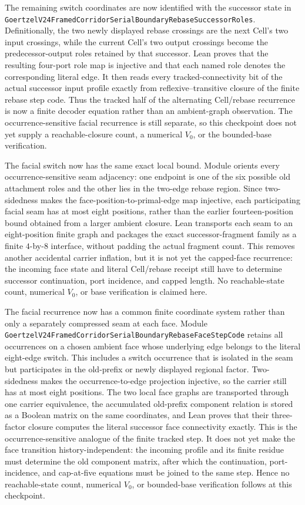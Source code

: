 \documentclass[11pt]{article}
\theoremstyle{definition}
\begin{document}
The remaining switch coordinates are now identified with the successor state
in
\texttt{GoertzelV24FramedCorridorSerialBoundaryRebaseSuccessorRoles}.
Definitionally, the two newly displayed rebase crossings are the next Cell's
two input crossings, while the current Cell's two output crossings become the
predecessor-output roles retained by that successor.  Lean proves that the
resulting four-port role map is injective and that each named role denotes the
corresponding literal edge.  It then reads every tracked-connectivity bit of
the actual successor input profile exactly from reflexive--transitive closure
of the finite rebase step code.  Thus the tracked half of the alternating
Cell/rebase recurrence is now a finite decoder equation rather than an
ambient-graph observation.  The occurrence-sensitive facial recurrence is
still separate, so this checkpoint does not yet supply a reachable-closure
count, a numerical $V_0$, or the bounded-base verification.

The facial switch now has the same exact local bound.  Module
orients every occurrence-sensitive seam adjacency: one endpoint is one of the
six possible old attachment roles and the other lies in the two-edge rebase
region.  Since two-sidedness makes the face-position-to-primal-edge map
injective, each participating facial seam has at most eight positions, rather
than the earlier fourteen-position bound obtained from a larger ambient
closure.  Lean transports each seam to an eight-position finite graph and
packages the exact successor-fragment family as a finite $4$-by-$8$ interface,
without padding the actual fragment count.  This removes another accidental
carrier inflation, but it is not yet the capped-face recurrence: the incoming
face state and literal Cell/rebase receipt still have to determine successor
continuation, port incidence, and capped length.  No reachable-state count,
numerical $V_0$, or base verification is claimed here.

The facial recurrence now has a common finite coordinate system rather than
only a separately compressed seam at each face.  Module
\texttt{GoertzelV24FramedCorridorSerialBoundaryRebaseFaceStepCode} retains all
occurrences on a chosen ambient face whose underlying edge belongs to the
literal eight-edge switch.  This includes a switch occurrence that is
isolated in the seam but participates in the old-prefix or newly displayed
regional factor.  Two-sidedness makes the occurrence-to-edge projection
injective, so the carrier still has at most eight positions.  The two local
face graphs are transported through one carrier equivalence, the accumulated
old-prefix component relation is stored as a Boolean matrix on the same
coordinates, and Lean proves that their three-factor closure computes the
literal successor face connectivity exactly.  This is the
occurrence-sensitive analogue of the finite tracked step.  It does not yet
make the face transition history-independent: the incoming profile and its
finite residue must determine the old component matrix, after which the
continuation, port-incidence, and cap-at-five equations must be joined to the
same step.  Hence no reachable-state count, numerical $V_0$, or bounded-base
verification follows at this checkpoint.
\end{document}
